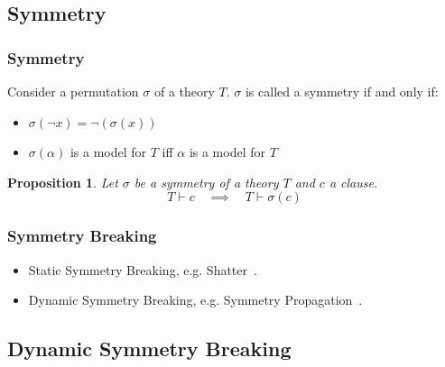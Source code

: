 \documentclass{beamer}
\newtheorem{proposition}{Proposition}
\begin{document}
	\subsection{Symmetry}
	\begin{frame}
		\frametitle{Symmetry}

		\begin{definition}[Symmetry]
			Consider a permutation $\sigma$ of a theory $T$. $\sigma$ is called a symmetry if and only if:
			\begin{itemize}
				\item $\sigma(\neg x) = \neg(\sigma(x))$
				\item $\sigma(\alpha)$ is a model for $T$ iff $\alpha$ is a model for $T$
			\end{itemize}
		\end{definition}

		\pause

		\begin{proposition}
			Let $\sigma$ be a symmetry of a theory $T$ and $c$ a clause.
			\begin{equation}
				T \vdash c \quad \implies \quad T \vdash \sigma( c )
			\end{equation}
		\end{proposition}
	\end{frame}

	\begin{frame}
		\frametitle{Symmetry Breaking}

		\begin{itemize}
			\item Static Symmetry Breaking, e.g. Shatter~\cite{aloul2004shatterpb}.
			\item Dynamic Symmetry Breaking, e.g. Symmetry Propagation~\cite{devriendt2012symmetry}.
		\end{itemize}
	\end{frame}

	\subsection{Dynamic Symmetry Breaking}
%
%
%
%
\end{document}
